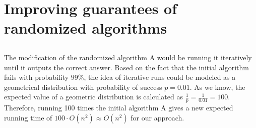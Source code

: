 \documentclass[11pt]{537homework}
\author{Emmanouil Kritharakis}
\begin{document}
\section{Improving guarantees of randomized algorithms}


\subsection{}
The modification of the randomized algorithm A would be running it iteratively until it outputs the correct answer. Based on the fact that the initial algorithm fails with probability $99\%$, the idea of iterative runs could be modeled as a geometrical distribution with probability of success $p = 0.01$. As we know, the expected value of a geometric distribution is calculated as $\frac{1}{p} = \frac{1}{0.01} = 100$. Therefore, running 100 times the initial algorithm A gives a new expected running time of $100 \cdot O(n^2) \approx O(n^2) $ for our approach.
\end{document}
